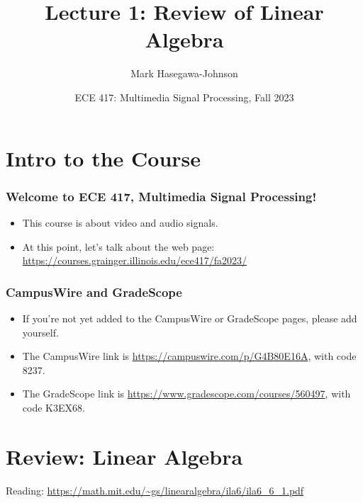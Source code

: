 \documentclass{beamer}
\title{Lecture 1: Review of Linear Algebra}
\author{Mark Hasegawa-Johnson}
\date{ECE 417: Multimedia Signal Processing, Fall 2023}
\begin{document}
\begin{frame}
  \maketitle
\end{frame}

\begin{frame}
  \tableofcontents
\end{frame}


\section[Course Intro]{Intro to the Course}
\setcounter{subsection}{1}
\begin{frame}
  \frametitle{Welcome to ECE 417, Multimedia Signal Processing!}

  \begin{itemize}
  \item This course is about video and audio signals.
  \item At this point, let's talk about the web page:
    \url{https://courses.grainger.illinois.edu/ece417/fa2023/}
  \end{itemize}
\end{frame}
  
\begin{frame}
  \frametitle{CampusWire and GradeScope}

  \begin{itemize}
  \item If you're not yet added to the CampusWire or GradeScope pages,
    please add yourself.
  \item The CampusWire link is \url{https://campuswire.com/p/G4B80E16A}, with code 8237.
  \item The GradeScope link is \url{https://www.gradescope.com/courses/560497}, with code K3EX68.
  \end{itemize}
\end{frame}
  
\section[Linear Algebra]{Review: Linear Algebra}
\setcounter{subsection}{1}
\begin{frame}
  Reading: \url{https://math.mit.edu/~gs/linearalgebra/ila6/ila6_6_1.pdf}
\end{frame}
\end{document}
